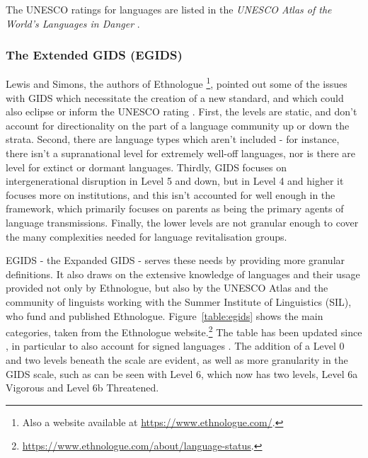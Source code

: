 The UNESCO ratings for languages are listed in the \textit{UNESCO Atlas of the World's Languages in Danger} \citep{unesco2014unesco}.

\subsubsection{The Extended GIDS (EGIDS)}

Lewis and Simons, the authors of Ethnologue \citep{lewis2009ethnologue}\footnote{Also a website available at \href{https://www.ethnologue.com/}{https://www.ethnologue.com/}. }, pointed out some of the issues with GIDS which necessitate the creation of a new standard, and which could also eclipse or inform the UNESCO rating \citep{lewis2010assessing}. First, the levels are static, and don't account for directionality on the part of a language community up or down the strata. Second, there are language types which aren't included - for instance, there isn't a supranational level for extremely well-off languages, nor is there are level for extinct or dormant languages. Thirdly, GIDS focuses on intergenerational disruption in Level 5 and down, but in Level 4 and higher it focuses more on institutions, and this isn't accounted for well enough in the framework, which primarily focuses on parents as being the primary agents of language transmissions. Finally, the lower levels are not granular enough to cover the many complexities needed for language revitalisation groups.

EGIDS - the Expanded GIDS - serves these needs by providing more granular definitions. It also draws on the extensive knowledge of languages and their usage provided not only by Ethnologue, but also by the UNESCO Atlas and the community of linguists working with the Summer Institute of Linguistics (SIL), who fund and published Ethnologue. Figure~\ref{table:egids} shows the main categories, taken from the Ethnologue website.\footnote{\href{https://www.ethnologue.com/about/language-status}{https://www.ethnologue.com/about/language-status}. } The table has been updated since \citet{lewis2010assessing}, in particular to also account for signed languages \citep{bickford2015rating}. The addition of a Level 0 and two levels beneath the scale are evident, as well as more granularity in the GIDS scale, such as can be seen with Level 6, which now has two levels, Level 6a Vigorous and Level 6b Threatened.

